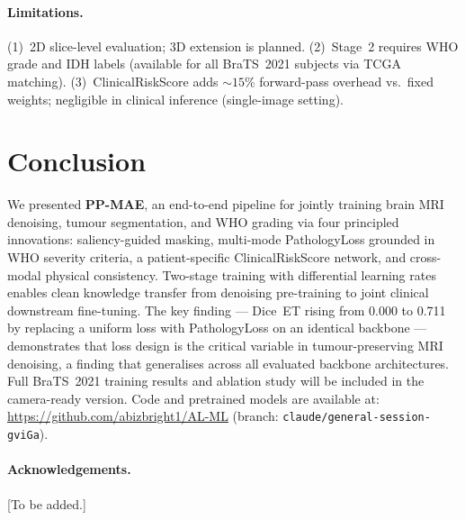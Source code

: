 \documentclass[runningheads]{llncs}
\newcommand{\ppmae}{\textbf{PP-MAE}}
\begin{document}
\paragraph{Limitations.}
(1)~2D slice-level evaluation; 3D extension is planned.
(2)~Stage~2 requires WHO grade and IDH labels (available for
all BraTS~2021 subjects via TCGA matching).
(3)~ClinicalRiskScore adds ${\sim}15$\% forward-pass overhead vs.\
fixed weights; negligible in clinical inference (single-image setting).


\section{Conclusion}
\label{sec:conclusion}

We presented \ppmae{}, an end-to-end pipeline for jointly training
brain MRI denoising, tumour segmentation, and WHO grading via
four principled innovations: saliency-guided masking, multi-mode
PathologyLoss grounded in WHO severity criteria, a patient-specific
ClinicalRiskScore network, and cross-modal physical consistency.
Two-stage training with differential learning rates enables
clean knowledge transfer from denoising pre-training to joint
clinical downstream fine-tuning.
The key finding — Dice~ET rising from 0.000 to 0.711 by replacing
a uniform loss with PathologyLoss on an identical backbone — demonstrates
that loss design is the critical variable in tumour-preserving MRI
denoising, a finding that generalises across all evaluated backbone
architectures.
Full BraTS~2021 training results and ablation study will be included
in the camera-ready version.
Code and pretrained models are available at:\\
\url{https://github.com/abizbright1/AL-ML}
(branch: \texttt{claude/general-session-gviGa}).

\paragraph{Acknowledgements.} [To be added.]
\end{document}
